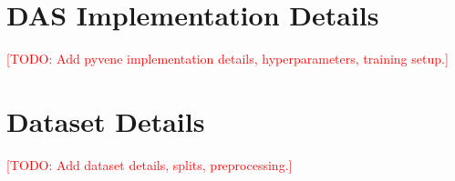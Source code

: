 \documentclass{article}
\newcommand{\todo}[1]{\textcolor{red}{[TODO: #1]}}
\begin{document}
\section{DAS Implementation Details}
\label{app:das}


\todo{Add pyvene implementation details, hyperparameters, training setup.}

\section{Dataset Details}
\label{app:data}


\todo{Add dataset details, splits, preprocessing.}
\end{document}
